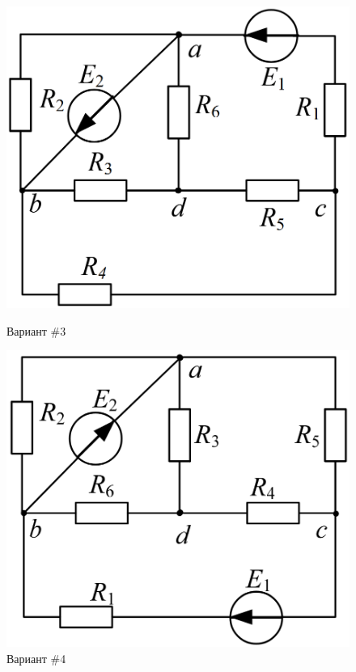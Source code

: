 \begin{figure}[H]
    \centering
    \begin{minipage}{0.48\textwidth}
        \centering
        \includegraphics[width=\textwidth]{images/3_task.png}
        \caption{Вариант \#3}
        \label{fig:task_3}
    \end{minipage}
    \hfill
    \begin{minipage}{0.48\textwidth}
        \centering
        \includegraphics[width=\textwidth]{images/4_task.png}
        \caption{Вариант \#4}
        \label{fig:task_4}
    \end{minipage}
\end{figure}

